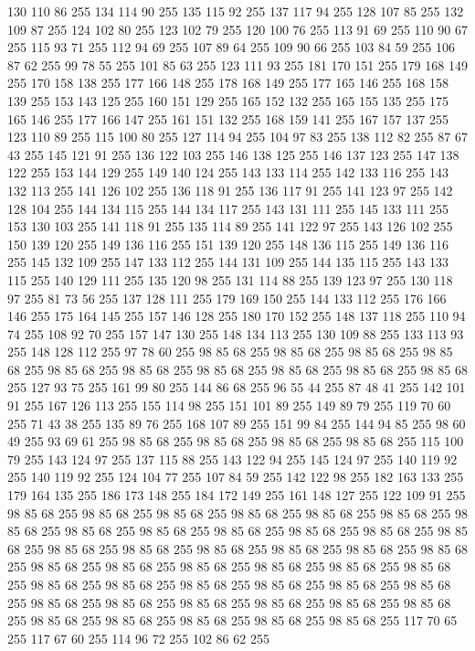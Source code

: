 130 110 86 255 134 114 90 255 135 115 92 255 137 117 94 255 128 107 85 255 132 109 87 255 124 102 80 255 123 102 79 255 120 100 76 255 113 91 69 255 110 90 67 255 115 93 71 255 112 94 69 255 107 89 64 255 109 90 66 255 103 84 59 255 106 87 62 255 99 78 55 255 101 85 63 255 123 111 93 255 181 170 151 255 179 168 149 255 170 158 138 255 177 166 148 255 178 168 149 255 177 165 146 255 168 158 139 255 153 143 125 255 160 151 129 255 165 152 132 255 165 155 135 255 175 165 146 255 177 166 147 255 161 151 132 255 168 159 141 255 167 157 137 255 123 110 89 255 115 100 80 255 127 114 94 255 104 97 83 255 138 112 82 255 87 67 43 255 145 121 91 255 136 122 103 255 146 138 125 255 146 137 123 255 147 138 122 255 153 144 129 255 149 140 124 255 143 133 114 255 142 133 116 255 143 132 113 255 141 126 102 255 136 118 91 255 136 117 91 255 141 123 97 255 142 128 104 255 144 134 115 255 144 134 117 255 143 131 111 255 145 133 111 255 153 130 103 255 141 118 91 255 135 114 89 255
141 122 97 255 143 126 102 255 150 139 120 255 149 136 116 255 151 139 120 255 148 136 115 255 149 136 116 255 145 132 109 255 147 133 112 255 144 131 109 255 144 135 115 255 143 133 115 255 140 129 111 255 135 120 98 255 131 114 88 255 139 123 97 255 130 118 97 255 81 73 56 255 137 128 111 255 179 169 150 255 144 133 112 255 176 166 146 255 175 164 145 255 157 146 128 255 180 170 152 255 148 137 118 255 110 94 74 255 108 92 70 255 157 147 130 255 148 134 113 255 130 109 88 255 133 113 93 255 148 128 112 255 97 78 60 255 98 85 68 255 98 85 68 255 98 85 68 255 98 85 68 255 98 85 68 255 98 85 68 255 98 85 68 255 98 85 68 255 98 85 68 255 98 85 68 255 127 93 75 255 161 99 80 255 144 86 68 255 96 55 44 255 87 48 41 255 142 101 91 255 167 126 113 255 155 114 98 255 151 101 89 255 149 89 79 255 119 70 60 255 71 43 38 255 135 89 76 255 168 107 89 255 151 99 84 255 144 94 85 255 98 60 49 255 93 69 61 255 98 85 68 255 98 85 68 255
98 85 68 255 98 85 68 255 115 100 79 255 143 124 97 255 137 115 88 255 143 122 94 255 145 124 97 255 140 119 92 255 140 119 92 255 124 104 77 255 107 84 59 255 142 122 98 255 182 163 133 255 179 164 135 255 186 173 148 255 184 172 149 255 161 148 127 255 122 109 91 255 98 85 68 255 98 85 68 255 98 85 68 255 98 85 68 255 98 85 68 255 98 85 68 255 98 85 68 255 98 85 68 255 98 85 68 255 98 85 68 255 98 85 68 255 98 85 68 255 98 85 68 255 98 85 68 255 98 85 68 255 98 85 68 255 98 85 68 255 98 85 68 255 98 85 68 255 98 85 68 255 98 85 68 255 98 85 68 255 98 85 68 255 98 85 68 255 98 85 68 255 98 85 68 255 98 85 68 255 98 85 68 255 98 85 68 255 98 85 68 255 98 85 68 255 98 85 68 255 98 85 68 255 98 85 68 255 98 85 68 255 98 85 68 255 98 85 68 255 98 85 68 255 98 85 68 255 98 85 68 255 98 85 68 255 98 85 68 255 117 70 65 255 117 67 60 255 114 96 72 255 102 86 62 255
